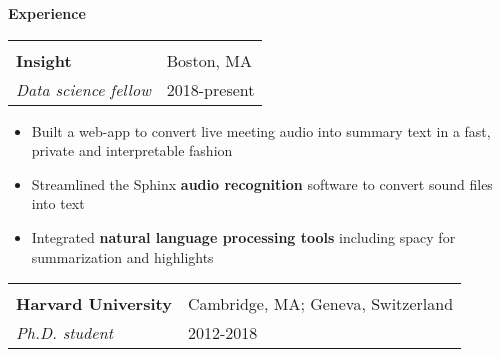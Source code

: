 \documentclass[letterpaper,11pt,oneside]{article}
\newcommand{\crimson}[1]{\textcolor[rgb]{0.67, 0.11, 0.188}{#1}}
\begin{document}
 \vspace{-0.35cm}
 \raggedright
 \textbf{\Large{\crimson{E}xperience}} \sout{\hfill} \\
 \normalsize
\begin{flushleft}
 \vspace{-0.45cm}
 \begin{tabular}{@{} l l }
    \hspace{0.8\linewidth} & \hspace{0.1\linewidth} \\
    \textbf{Insight} & Boston, MA \\ 
    \textit{Data science fellow} & 2018-present \\ 
 \end{tabular}
 \end{flushleft}
 \begin{flushleft}
 \begin{small}
 \begin{itemize}[leftmargin=*]
 \item Built a web-app to convert live meeting audio into summary text in a fast, private and interpretable fashion
 \item Streamlined the Sphinx \textbf{audio recognition} software to convert sound files into text
 \item Integrated \textbf{natural language processing tools} including spacy for summarization and highlights
 \end{itemize}
 \end{small}
 \end{flushleft}
 \begin{flushleft}
 \vspace{-0.25cm}
 \begin{tabular}{@{} l l }
    \hspace{0.55\linewidth} & \hspace{0.25\linewidth} \\
    \textbf{Harvard University} & Cambridge, MA; Geneva, Switzerland \\ 
    \textit{Ph.D. student} & \hspace{0.245\linewidth} 2012-2018 \\ 
 \end{tabular}
 \end{flushleft}
\end{document}
